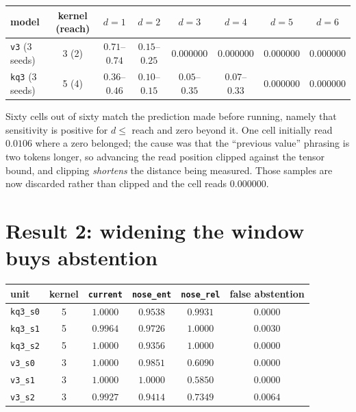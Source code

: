 \documentclass[10pt]{article}
\begin{document}
\begin{center}
\begin{tabular}{lccccccc}
\toprule
model & kernel (reach) & $d{=}1$ & $d{=}2$ & $d{=}3$ & $d{=}4$ & $d{=}5$ & $d{=}6$ \\
\midrule
\texttt{v3} (3 seeds) & 3 (2) & $0.71$--$0.74$ & $0.15$--$0.25$ & $\mathbf{0.000000}$ & $\mathbf{0.000000}$ & $\mathbf{0.000000}$ & $\mathbf{0.000000}$ \\
\texttt{kq3} (3 seeds) & 5 (4) & $0.36$--$0.46$ & $0.10$--$0.15$ & $0.05$--$0.35$ & $0.07$--$0.33$ & $\mathbf{0.000000}$ & $\mathbf{0.000000}$ \\
\bottomrule
\end{tabular}
\end{center}

Sixty cells out of sixty match the prediction made before running, namely that sensitivity is positive
for $d \le$ reach and zero beyond it. One cell initially read $0.0106$ where a zero belonged; the cause
was that the ``previous value'' phrasing is two tokens longer, so advancing the read position clipped
against the tensor bound, and clipping \emph{shortens} the distance being measured. Those samples are
now discarded rather than clipped and the cell reads $0.000000$.

\section{Result 2: widening the window buys abstention}

\begin{center}
\begin{tabular}{lccccc}
\toprule
unit & kernel & \texttt{current} & \texttt{nose\_ent} & \textbf{\texttt{nose\_rel}} & false abstention \\
\midrule
\texttt{kq3\_s0} & 5 & $1.0000$ & $0.9538$ & $\mathbf{0.9931}$ & $0.0000$ \\
\texttt{kq3\_s1} & 5 & $0.9964$ & $0.9726$ & $\mathbf{1.0000}$ & $0.0030$ \\
\texttt{kq3\_s2} & 5 & $1.0000$ & $0.9356$ & $\mathbf{1.0000}$ & $0.0000$ \\
\midrule
\texttt{v3\_s0} & 3 & $1.0000$ & $0.9851$ & $0.6090$ & $0.0000$ \\
\texttt{v3\_s1} & 3 & $1.0000$ & $1.0000$ & $0.5850$ & $0.0000$ \\
\texttt{v3\_s2} & 3 & $0.9927$ & $0.9414$ & $0.7349$ & $0.0064$ \\
\bottomrule
\end{tabular}
\end{center}
\end{document}
